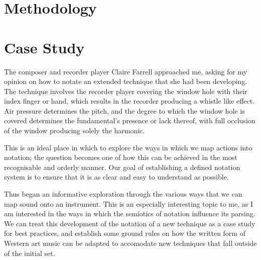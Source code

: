 \section{Methodology}


\section{Case Study}

The composer and recorder player Claire Farrell approached me, asking for my opinion on how to notate an extended technique that she had been developing. 
The technique involves the recorder player covering the window hole with their index finger or hand, which results in the recorder producing a whistle like effect. 
Air pressure determines the pitch, and the degree to which the window hole is covered determines the fundamental's presence or lack thereof, with full occlusion of the window producing solely the harmonic. 

This is an ideal place in which to explore the ways in which we map actions into notation; the question becomes one of how this can be achieved in the most recognisable and orderly manner. 
Our goal of establishing a defined notation system is to ensure that it is as clear and easy to understand as possible. 

Thus began an informative exploration through the various ways that we can map sound onto an instrument. 
This is an especially interesting topic to me, as I am interested in the ways in which the semiotics of notation influence its parsing. 
We can treat this development of the notation of a new technique as a case study for best practices, and establish some ground rules on how the written form of Western art music can be adapted to accomodate new techniques that fall outside of the initial set.

